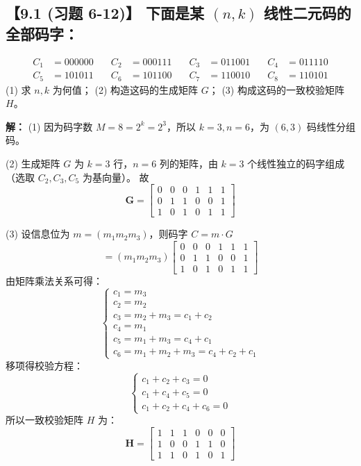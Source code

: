 \documentclass[11pt, a4paper]{article}
\begin{document}
\subsection*{【9.1 (习题 6-12)】 下面是某 $(n, k)$ 线性二元码的全部码字：}
\[
\begin{aligned}
C_1 &= 000000 \quad & C_2 &= 000111 \quad & C_3 &= 011001 \quad & C_4 &= 011110 \\
C_5 &= 101011 \quad & C_6 &= 101100 \quad & C_7 &= 110010 \quad & C_8 &= 110101
\end{aligned}
\]
(1) 求 $n, k$ 为何值；
(2) 构造这码的生成矩阵 $G$；
(3) 构成这码的一致校验矩阵 $H$。

\textbf{解：}
(1) 因为码字数 $M = 8 = 2^k = 2^3$，所以 $k=3, n=6$，为 $(6, 3)$ 码线性分组码。

(2) 生成矩阵 $G$ 为 $k=3$ 行，$n=6$ 列的矩阵，由 $k=3$ 个线性独立的码字组成（选取 $C_2, C_3, C_5$ 为基向量）。
故
\[
\mathbf{G} = \begin{bmatrix}
0 & 0 & 0 & 1 & 1 & 1 \\
0 & 1 & 1 & 0 & 0 & 1 \\
1 & 0 & 1 & 0 & 1 & 1
\end{bmatrix}
\]

(3) 设信息位为 $m = (m_1 m_2 m_3)$，则码字 $C = m \cdot G$
\[
= (m_1 m_2 m_3) \begin{bmatrix}
0 & 0 & 0 & 1 & 1 & 1 \\
0 & 1 & 1 & 0 & 0 & 1 \\
1 & 0 & 1 & 0 & 1 & 1
\end{bmatrix}
\]
由矩阵乘法关系可得：
\[
\begin{cases}
c_1 = m_3 \\
c_2 = m_2 \\
c_3 = m_2 + m_3 = c_1 + c_2 \\
c_4 = m_1 \\
c_5 = m_1 + m_3 = c_4 + c_1 \\
c_6 = m_1 + m_2 + m_3 = c_4 + c_2 + c_1
\end{cases}
\]
移项得校验方程：
\[
\begin{cases}
c_1 + c_2 + c_3 = 0 \\
c_1 + c_4 + c_5 = 0 \\
c_1 + c_2 + c_4 + c_6 = 0
\end{cases}
\]
所以一致校验矩阵 $H$ 为：
\[
\mathbf{H} = \begin{bmatrix}
1 & 1 & 1 & 0 & 0 & 0 \\
1 & 0 & 0 & 1 & 1 & 0 \\
1 & 1 & 0 & 1 & 0 & 1
\end{bmatrix}
\]
\end{document}
